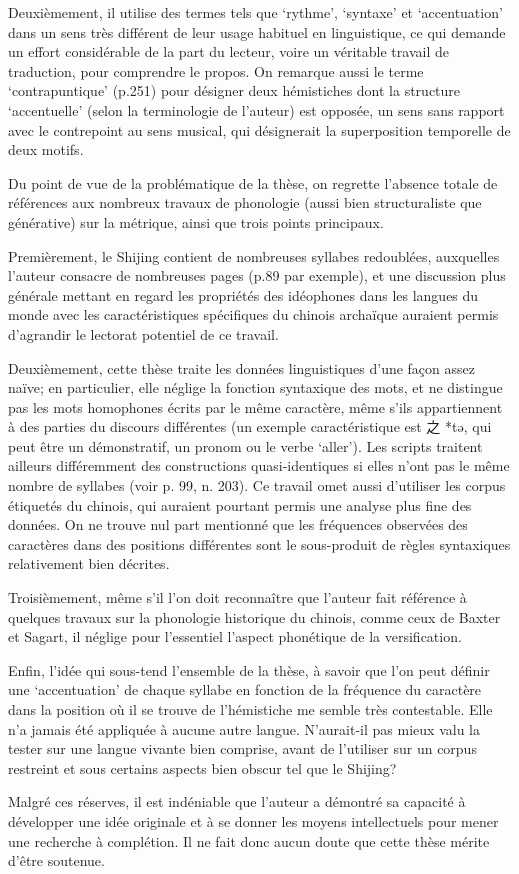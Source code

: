 \documentclass[oldfontcommands,oneside,a4paper,11pt]{article}
\newcommand{\ipa}[1]{{\phon \mbox{#1}}} %
\newcommand{\zh}[1]{{\cn #1}}
\begin{document}
Deuxièmement, il utilise des termes tels que `rythme', `syntaxe' et `accentuation' dans un sens très différent de leur usage habituel en linguistique, ce qui demande un effort considérable de la part du lecteur, voire un véritable travail de traduction, pour comprendre le propos. On remarque aussi le terme `contrapuntique' (p.251) pour désigner deux hémistiches dont la structure `accentuelle' (selon la terminologie de l'auteur) est opposée, un sens sans rapport avec le contrepoint au sens musical, qui désignerait la superposition temporelle de deux motifs.

Du point de vue de la problématique de la thèse, on regrette l'absence totale de références aux nombreux travaux de phonologie (aussi bien structuraliste que générative) sur la métrique, ainsi que trois points principaux.

Premièrement, le Shijing contient de nombreuses syllabes redoublées, auxquelles l'auteur consacre de nombreuses pages (p.89 par exemple), et une discussion plus générale mettant en regard les propriétés des idéophones dans les langues du monde avec les caractéristiques spécifiques du chinois archaïque auraient permis d'agrandir le lectorat potentiel de ce travail.

Deuxièmement, cette thèse traite les données linguistiques d'une façon assez naïve; en particulier, elle néglige la fonction syntaxique des mots, et ne distingue pas les mots homophones écrits par le même caractère, même s'ils appartiennent à des parties du discours différentes (un exemple caractéristique est \zh{之} *\ipa{tə}, qui peut être un démonstratif, un pronom ou le verbe `aller'). Les scripts traitent ailleurs différemment des constructions quasi-identiques si elles n'ont pas le même nombre de syllabes (voir p. 99, n. 203). Ce travail omet aussi d'utiliser les corpus étiquetés du chinois, qui auraient pourtant permis une analyse plus fine des données. On ne trouve nul part mentionné que les fréquences observées des caractères dans des positions différentes sont le sous-produit de règles syntaxiques relativement bien décrites.


Troisièmement, même s'il l'on doit reconnaître que l'auteur fait référence à quelques travaux sur la phonologie historique du chinois, comme ceux de Baxter et Sagart, il néglige pour l'essentiel l'aspect phonétique de la versification.

Enfin, l'idée qui sous-tend l'ensemble de la thèse, à savoir que l'on peut définir une `accentuation' de chaque syllabe en fonction de la fréquence du caractère dans la position où il se trouve de l'hémistiche me semble très contestable. Elle n'a jamais été appliquée à aucune autre langue. N'aurait-il pas mieux valu la tester sur une langue vivante bien comprise, avant de l'utiliser sur un corpus restreint et sous certains aspects bien obscur tel que le Shijing?


Malgré ces réserves, il est indéniable que l'auteur a démontré sa capacité à  développer une idée originale et  à se donner les moyens intellectuels pour mener une recherche à complétion. Il ne fait donc aucun doute que cette thèse mérite d'être soutenue.

%
%
\end{document}
